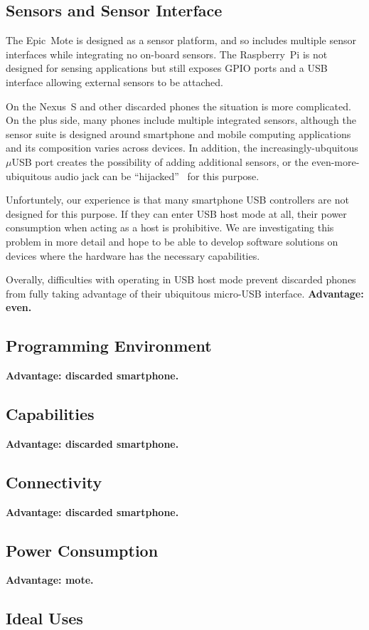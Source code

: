 \subsection{Sensors and Sensor Interface}

The Epic~Mote is designed as a sensor platform, and so includes multiple
sensor interfaces while integrating no on-board sensors. The Raspberry~Pi is
not designed for sensing applications but still exposes GPIO ports and a USB
interface allowing external sensors to be attached.

On the Nexus~S and other discarded phones the situation is more complicated.
On the plus side, many phones include multiple integrated sensors, although
the sensor suite is designed around smartphone and mobile computing
applications and its composition varies across devices. In addition, the
increasingly-ubquitous $\mu$USB port creates the possibility of adding
additional sensors, or the even-more-ubiquitous audio jack can be
``hijacked''~\cite{FIXME-audiohijak} for this purpose.

Unfortuntely, our experience is that many smartphone USB controllers are not
designed for this purpose. If they can enter USB host mode at all, their
power consumption when acting as a host is prohibitive.  We are investigating this problem in more
detail and hope to be able to develop software solutions on devices where the
hardware has the necessary capabilities.

Overally, difficulties with operating in USB host mode prevent discarded
phones from fully taking advantage of their ubiquitous micro-USB interface.
\textbf{Advantage: even.}

\subsection{Programming Environment}

\textbf{Advantage: discarded smartphone.}

\subsection{Capabilities}

\textbf{Advantage: discarded smartphone.}

\subsection{Connectivity}

\textbf{Advantage: discarded smartphone.}

\subsection{Power Consumption}

\textbf{Advantage: mote.}

\subsection{Ideal Uses}
